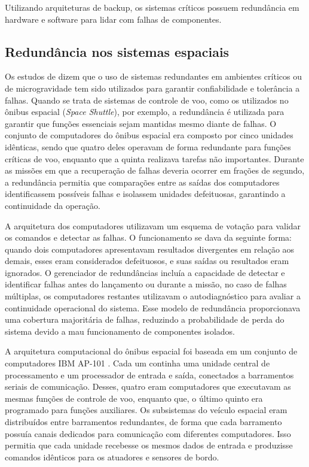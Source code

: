 Utilizando arquiteturas de backup, os sistemas críticos possuem redundância em hardware e software para lidar com falhas de componentes.

\subsection{Redundância nos sistemas espaciais }

Os estudos de \cite{sklaroff1976} dizem que o uso de sistemas redundantes em ambientes críticos ou de microgravidade tem sido utilizados para garantir confiabilidade e tolerância a falhas. Quando se trata de sistemas de controle de voo, como os utilizados no ônibus espacial (\textit{Space Shuttle}), por exemplo, a redundância é utilizada para garantir que funções essenciais sejam mantidas mesmo diante de falhas. O conjunto de computadores do ônibus espacial era composto por cinco unidades idênticas, sendo que quatro deles operavam de forma redundante para funções críticas de voo, enquanto que a quinta realizava tarefas não importantes. Durante as missões em que a recuperação de falhas deveria ocorrer em frações de segundo, a redundância permitia que comparações entre as saídas dos computadores identificassem possíveis falhas e isolassem unidades defeituosas, garantindo a continuidade da operação.

A arquitetura dos computadores utilizavam um esquema de votação para validar os comandos e detectar as falhas. O funcionamento se dava da seguinte forma: quando dois computadores apresentavam resultados divergentes em relação aos demais, esses eram considerados defeituosos, e suas saídas ou resultados eram ignorados. O gerenciador de redundâncias incluía a capacidade de detectar e identificar falhas antes do lançamento ou durante a missão, no caso de falhas múltiplas, os computadores restantes utilizavam o autodiagnóstico para avaliar a continuidade operacional do sistema. Esse modelo de redundância proporcionava uma cobertura majoritária de falhas, reduzindo a probabilidade de perda do sistema devido a mau funcionamento de componentes isolados.

A arquitetura computacional do ônibus espacial foi baseada em um conjunto de computadores IBM AP-101 \citep{ibm_space_shuttle}. Cada um continha uma unidade central de processamento e um processador de entrada e saída, conectados a barramentos seriais de comunicação. Desses, quatro eram computadores que executavam as mesmas funções de controle de voo, enquanto que, o último quinto era programado para funções auxiliares. Os subsistemas do veículo espacial eram distribuídos entre barramentos redundantes, de forma que cada barramento possuía canais dedicados para comunicação com diferentes computadores. Isso permitia que cada unidade recebesse os mesmos dados de entrada e produzisse comandos idênticos para os atuadores e sensores de bordo.

